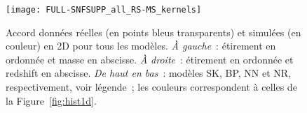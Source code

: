 \documentclass[../main/main.tex]{subfiles}
\begin{document}

\begin{figure}[p]
    \vspace*{-2.2cm}
    \centerfloat
    \texttt{[image: FULL-SNFSUPP\_all\_RS-MS\_kernels]}
    \caption[Accord entre les données réelles et simulées en 2 dimensions pour
    tous les modèles]{Accord données réelles (en points bleus transparents) et
        simulées (en couleur) en 2D pour tous les modèles. \textit{À gauche}~:
        étirement en ordonnée et masse en abscisse. \textit{À droite}~:
        étirement en ordonnée et redshift en abscisse. \textit{De haut en bas}~:
    modèles SK, BP, NN et NR, respectivement, voir légende~; les couleurs
correspondent à celles de la Figure~\ref{fig:hist1d}.}
    \label{fig:2dhex}
\end{figure}
\end{document}
